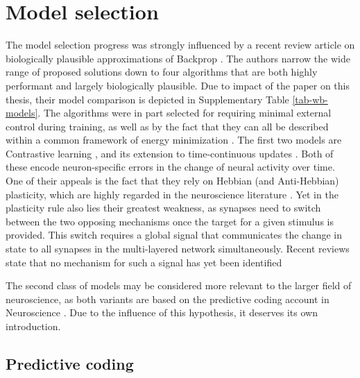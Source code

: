 \section{Model selection}\label{sec-model-selection}

The model selection progress was strongly influenced by a recent review article on biologically plausible approximations
of Backprop \citep{whittington2019theories}. The authors narrow the wide range of proposed solutions down to four
algorithms that are both highly performant and largely biologically plausible. Due to impact of the paper on this
thesis, their model comparison is depicted in Supplementary Table \ref{tab-wb-models}. The algorithms were in part
selected for requiring minimal external control during training, as well as by the fact that they can all be described
within a common framework of energy minimization \citep{Scellier2017}. The first two models are Contrastive learning
\citep{OReilly1996}, and its extension to time-continuous updates \citep{Bengio2017}. Both of these encode
neuron-specific errors in the change of neural activity over time. One of their appeals is the fact that they rely on
Hebbian (and Anti-Hebbian) plasticity, which are highly regarded in the neuroscience literature
\citep{magee2020synaptic,Brea2016}. Yet in the plasticity rule also lies their greatest weakness, as synapses need to
switch between the two opposing mechanisms once the target for a given stimulus is provided. This switch requires a
global signal that communicates the change in state to all synapses in the multi-layered network simultaneously. Recent
reviews state that no mechanism for such a signal has yet been identified
\citep{whittington2019theories,Richards2019}

The second class of models may be considered more relevant to the larger field of neuroscience, as both variants are
based on the predictive coding account in Neuroscience \citep{rao1999predictive}. Due to the influence of this
hypothesis, it deserves its own introduction.

\subsection{Predictive coding}

